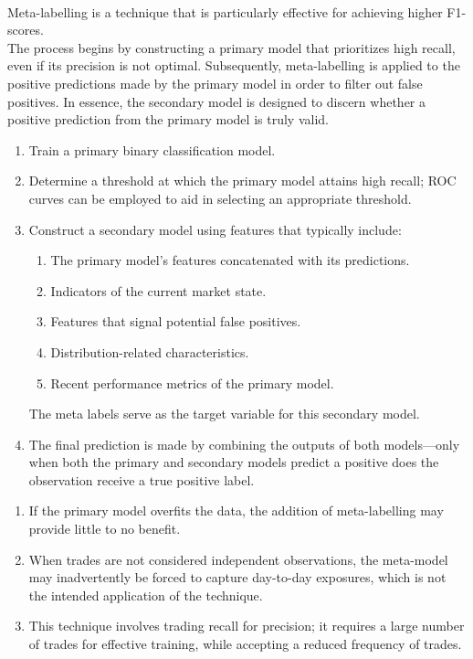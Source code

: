 \begin{method} \\
Meta-labelling is a technique that is particularly effective for achieving higher F1-scores.\\
The process begins by constructing a primary model that prioritizes high recall, even if its precision is not optimal. Subsequently, meta-labelling is applied to the positive predictions made by the primary model in order to filter out false positives. In essence, the secondary model is designed to discern whether a positive prediction from the primary model is truly valid.
\begin{enumerate}[label=\roman*.]
\setlength{\itemsep}{0pt}
\item Train a primary binary classification model.
\item Determine a threshold at which the primary model attains high recall; ROC curves can be employed to aid in selecting an appropriate threshold.
\item Construct a secondary model using features that typically include:
\begin{enumerate}[label=\roman*.]
\setlength{\itemsep}{0pt}
\item The primary model’s features concatenated with its predictions.
\item Indicators of the current market state.
\item Features that signal potential false positives.
\item Distribution-related characteristics.
\item Recent performance metrics of the primary model.
\end{enumerate}
The meta labels serve as the target variable for this secondary model.
\item The final prediction is made by combining the outputs of both models—only when both the primary and secondary models predict a positive does the observation receive a true positive label.
\end{enumerate}
\end{method}

\begin{remark} 
\begin{enumerate}[label=\roman*.]
\setlength{\itemsep}{0pt}
\item If the primary model overfits the data, the addition of meta-labelling may provide little to no benefit.
\item When trades are not considered independent observations, the meta-model may inadvertently be forced to capture day-to-day exposures, which is not the intended application of the technique.
\item This technique involves trading recall for precision; it requires a large number of trades for effective training, while accepting a reduced frequency of trades.
\end{enumerate}
\end{remark}

